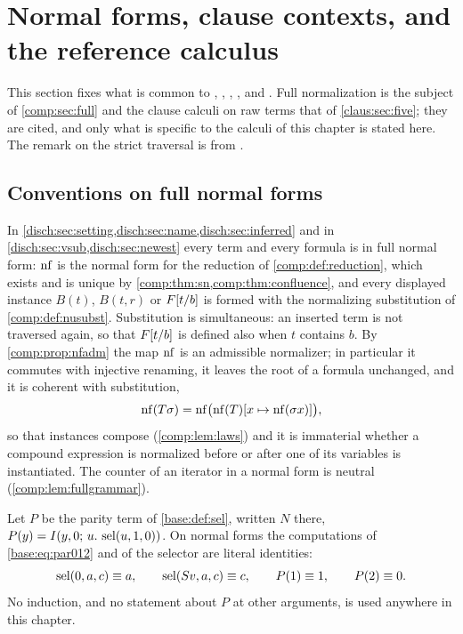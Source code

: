 \section{Normal forms, clause contexts, and the reference calculus}
\label{disch:sec:setting}

This section fixes what is common to ,
, ,
,  and
. Full normalization is the subject of
\cref{comp:sec:full} and the clause calculi on raw terms that of
\cref{claus:sec:five}; they are cited, and only what is specific to the
calculi of this chapter is stated here. The remark on the strict traversal
is from .

\subsection{Conventions on full normal forms}

In \cref{disch:sec:setting,disch:sec:name,disch:sec:inferred} and in
\cref{disch:sec:vsub,disch:sec:newest} every term and every formula is in
full normal form: $\operatorname{nf}$ is the normal form for the reduction of
\cref{comp:def:reduction}, which exists and is unique by
\cref{comp:thm:sn,comp:thm:confluence}, and every displayed instance
$B(t)$, $B(t,r)$ or $F[t/b]$ is formed with the normalizing
substitution of \cref{comp:def:nusubst}. Substitution is simultaneous: an
inserted term is not traversed again, so that $F[t/b]$ is defined
also when $t$ contains $b$. By \cref{comp:prop:nfadm} the map $\operatorname{nf}$ is an
admissible normalizer; in particular it commutes with injective renaming,
it leaves the root of a formula unchanged, and it is coherent with
substitution,
\begin{equation}
 \operatorname{nf}(T\sigma)=\operatorname{nf}\bigl(\operatorname{nf}(T)[x\mapsto\operatorname{nf}(\sigma x)]\bigr),
 \label{disch:eq:coherence}
\end{equation}
so that instances compose (\cref{comp:lem:laws}) and it is immaterial
whether a compound expression is normalized before or after one of its
variables is instantiated. The counter of an iterator in a normal form is
neutral (\cref{comp:lem:fullgrammar}).

Let $P$ be the parity term of \cref{base:def:sel}, written $N$ there,
$P(y)=I(y,0;\,u.\,\operatorname{sel}(u,1,0))$. On normal forms the computations of
\cref{base:eq:par012} and of the selector are literal identities:
\begin{equation}
 \operatorname{sel}(0,a,c)\equiv a,\qquad \operatorname{sel}(S v,a,c)\equiv c,\qquad
 P(1)\equiv 1,\qquad P(2)\equiv 0.
 \label{disch:eq:endpoints}
\end{equation}
No induction, and no statement about $P$ at other arguments, is used
anywhere in this chapter.

